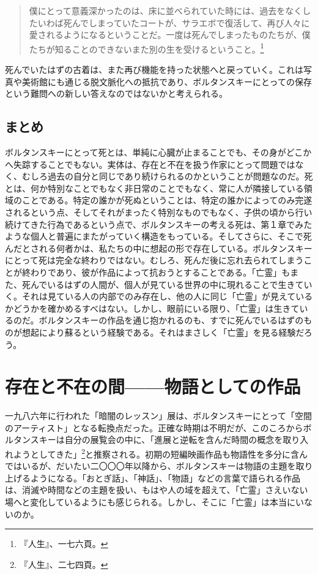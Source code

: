 \documentclass[b5j,twoside,twocolumn]{utarticle}
\begin{document}
\begin{quote}
僕にとって意義深かったのは、床に並べられていた時には、過去をなくしたいわば死んでしまっていたコートが、サラエボで復活して、再び人々に愛されるようになるということだ。一度は死んでしまったものたちが、僕たちが知ることのできないまた別の生を受けるということ。\footnote{『人生』、一七六頁。}
\end{quote}


死んでいたはずの古着は、また再び機能を持った状態へと戻っていく。これは写真や美術館にも通じる脱文脈化への抵抗であり、ボルタンスキーにとっての保存という難問への新しい答えなのではないかと考えられる。
\subsection{まとめ}
ボルタンスキーにとって死とは、単純に心臓が止まることでも、その身がどこかへ失踪することでもない。実体は、存在と不在を扱う作家にとって問題ではなく、むしろ過去の自分と同じであり続けられるのかということが問題なのだ。死とは、何か特別なことでもなく非日常のことでもなく、常に人が隣接している領域のことである。特定の誰かが死ぬということは、特定の誰かによってのみ完遂されるという点、そしてそれがまったく特別なものでもなく、子供の頃から行い続けてきた行為であるという点で、ボルタンスキーの考える死は、第１章でみたような個人と普遍にまたがっていく構造をもっている。そしてさらに、そこで死んだとされる何者かは、私たちの中に想起の形で存在している。ボルタンスキーにとって死は完全な終わりではない。むしろ、死んだ後に忘れ去られてしまうことが終わりであり、彼が作品によって抗おうとすることである。「亡霊」もまた、死んでいるはずの人間が、個人が見ている世界の中に現れることで生きていく。それは見ている人の内部でのみ存在し、他の人に同じ「亡霊」が見えているかどうかを確かめるすべはない。しかし、眼前にいる限り、「亡霊」は生きているのだ。ボルタンスキーの作品を通じ抱かれるのも、すでに死んでいるはずのものが想起により蘇るという経験である。それはまさしく「亡霊」を見る経験だろう。

\section{\tbaselineshift =3.0pt 存在と不在の間------物語としての作品}
一九八六年に行われた「暗闇のレッスン」展は、ボルタンスキーにとって「空間のアーティスト」となる転換点だった。正確な時期は不明だが、このころからボルタンスキーは自分の展覧会の中に、「進展と逆転を含んだ時間の概念を取り入れようとしてきた」\footnote{『人生』、二七四頁。}と推察される。初期の短編映画作品も物語性を多分に含んではいるが、だいたい二〇〇〇年以降から、ボルタンスキーは物語の主題を取り上げるようになる。「おとぎ話」、「神話」、「物語」などの言葉で語られる作品は、消滅や時間などの主題を扱い、もはや人の域を超えて、「亡霊」さえいない場へと変化しているようにも感じられる。しかし、そこに「亡霊」は本当にいないのか。
\end{document}
